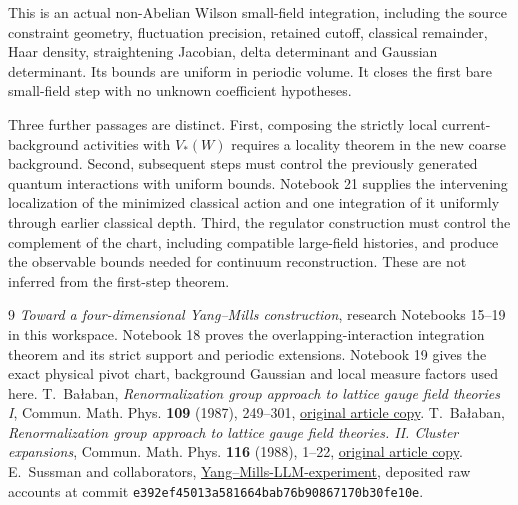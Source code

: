 \documentclass[11pt]{article}
\theoremstyle{remark}
\begin{document}
This is an actual non-Abelian Wilson small-field integration,
including the source constraint geometry, fluctuation
precision, retained cutoff, classical remainder, Haar density,
straightening Jacobian, delta determinant and Gaussian
determinant. Its bounds are uniform in periodic volume.
It closes the first bare small-field step with no unknown
coefficient hypotheses.

Three further passages are distinct. First, composing the
strictly local current-background activities with $V_*(W)$
requires a locality theorem in the new coarse background.
Second, subsequent steps must control the previously generated
quantum interactions with uniform bounds. Notebook 21 supplies
the intervening localization of the minimized classical action
and one integration of it uniformly through earlier classical
depth. Third, the regulator construction must
control the complement of the chart, including compatible
large-field histories, and produce the observable bounds
needed for continuum reconstruction. These are not inferred
from the first-step theorem.

\begin{thebibliography}{9}
\emph{Toward a four-dimensional Yang--Mills construction},
research Notebooks 15--19 in this workspace.
Notebook 18 proves the overlapping-interaction integration
theorem and its strict support and periodic extensions.
Notebook 19 gives the exact physical pivot chart, background
Gaussian and local measure factors used here.
T.~Ba\l aban,
\emph{Renormalization group approach to lattice gauge field
theories I}, Commun. Math. Phys. \textbf{109} (1987), 249--301,
\href{https://scispace.com/pdf/renormalization-group-approach-to-lattice-gauge-field-3ygai0vxt1.pdf}{original article copy}.
T.~Ba\l aban,
\emph{Renormalization group approach to lattice gauge field
theories. II. Cluster expansions},
Commun. Math. Phys. \textbf{116} (1988), 1--22,
\href{https://scispace.com/pdf/renormalization-group-approach-to-lattice-gauge-field-4penm4k7hc.pdf}{original article copy}.
E.~Sussman and collaborators,
\href{https://github.com/ethanwsussman/Yang--Mills-LLM-experiment}{Yang--Mills-LLM-experiment},
deposited raw accounts at commit
\texttt{e392ef45013a581664bab76b90867170b30fe10e}.
\end{thebibliography}
\end{document}
